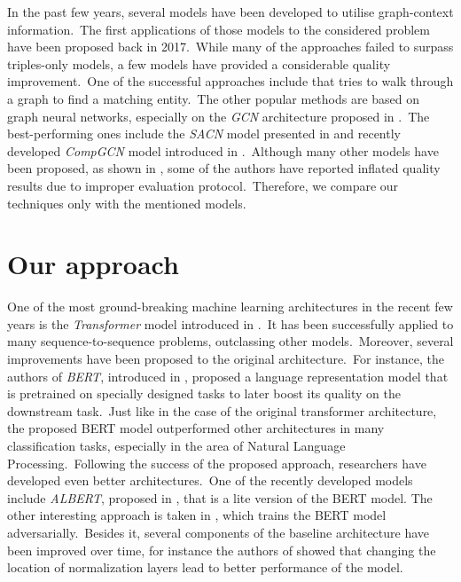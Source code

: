\documentclass[longabstract, english, mgr]{iithesis}
\theoremstyle{default_theorem_style}\newtheorem{theorem}{Theorem}
\theoremstyle{default_theorem_style}\newtheorem{definition}{Definition}
\begin{document}
\noindent In the past few years, several models have been developed to utilise graph-context information.\ The first
applications of those models to the considered problem have been proposed back in 2017.\ While many of the
approaches failed to surpass triples-only models, a few models have provided a considerable quality
improvement.\ One of the successful approaches include \cite{go_for_a_walk_model} that tries to walk through a graph
to find a matching entity.\ The other popular methods are based on graph neural
networks, especially on the \textit{GCN} architecture proposed in \cite{gcn_model}.\ The best-performing ones
include the \textit{SACN} model presented in \cite{sacn_model} and recently developed \textit{CompGCN} model
introduced in \cite{comp_gcn_model}.\ Although many other models have been proposed, as shown in
\cite{re_evaluation}, some of the authors have reported inflated quality results due to improper evaluation
protocol.\ Therefore, we compare our techniques only with the mentioned models.

\section{Our approach}

One of the most ground-breaking machine learning architectures in the recent few years is the \textit{Transformer} model
introduced in \cite{transformer_model}.\ It has been successfully applied to many sequence-to-sequence problems,
outclassing other models.\ Moreover, several improvements have been proposed to the original architecture.\ For
instance, the authors of \textit{BERT}, introduced in \cite{bert_model}, proposed a language
representation model that is pretrained on specially designed tasks to later boost its quality on the downstream
task.\ Just like in the case of the original transformer architecture, the proposed BERT model outperformed other
architectures in many classification tasks, especially in the area of Natural Language Processing.\ Following the
success of the proposed approach, researchers have developed even better architectures.\ One of the recently
developed models include \textit{ALBERT}, proposed in \cite{albert_model}, that is a lite version of the BERT model.
The other interesting approach is taken in \cite{electra_model}, which trains the BERT model adversarially.\ Besides it,
several components of the baseline architecture have been improved over time, for instance the authors of
\cite{layer_normalization_in_transformers} showed that changing the location of normalization layers lead to better
performance of the model.\newline
\end{document}

